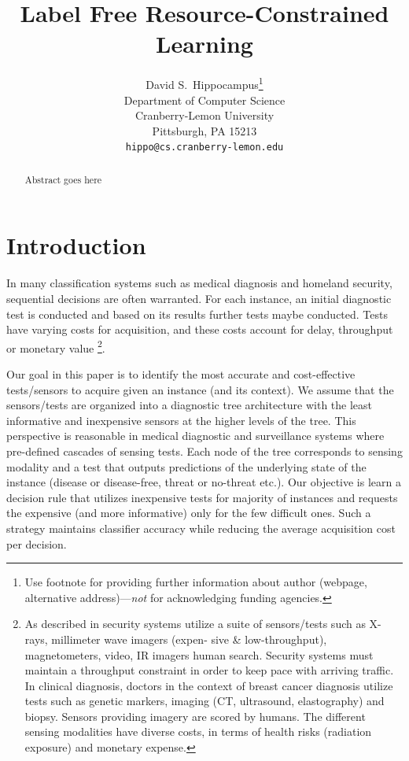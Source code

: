 \documentclass{article}
\title{Label Free Resource-Constrained Learning}
\author{
	David S.~Hippocampus\thanks{Use footnote for providing further
		information about author (webpage, alternative
		address)---\emph{not} for acknowledging funding agencies.} \\
	Department of Computer Science\\
	Cranberry-Lemon University\\
	Pittsburgh, PA 15213 \\
	\texttt{hippo@cs.cranberry-lemon.edu} \\
}
\begin{document}
	
	\maketitle
	
	\begin{abstract}
		Abstract goes here
	\end{abstract}

\section{Introduction}
In many classification systems  such as medical diagnosis  and  homeland  security,  sequential decisions  are  often  warranted.   For each  instance,  an initial diagnostic test  is conducted and based on its results further tests maybe conducted. Tests have varying  costs for  acquisition,  and  these  costs  account  for delay,  throughput  or  monetary  value \footnote{As described in \cite{Trapeznikov} security systems utilize a suite of sensors/tests such as X-rays, millimeter wave imagers (expen-
sive \& low-throughput), magnetometers, video, IR imagers human search.  Security systems  must  maintain  a  throughput  constraint  in  order to  keep  pace  with  arriving  traffic.   In  clinical  diagnosis, doctors  in the context of breast cancer diagnosis utilize tests such as genetic markers, imaging (CT, ultrasound, elastography) and biopsy. Sensors providing imagery are scored by humans. The different sensing  modalities  have  diverse  costs,  in  terms  of  health risks (radiation exposure) and monetary expense.}. 

Our goal in this paper is to identify the most accurate and cost-effective tests/sensors to acquire given an instance (and its context). We assume that the sensors/tests are organized into a diagnostic tree architecture with the least informative and inexpensive sensors at the higher levels of the tree. This perspective is reasonable in medical diagnostic and surveillance systems where pre-defined cascades of sensing tests. Each node of the tree corresponds to sensing modality and a test that outputs predictions of the underlying state of the instance (disease or disease-free, threat or no-threat etc.). Our objective is learn a decision rule that  utilizes  inexpensive tests for majority of instances and requests the expensive (and more informative) only for the few difficult ones. Such a strategy maintains classifier accuracy while reducing the average acquisition cost per decision. 
\end{document}
